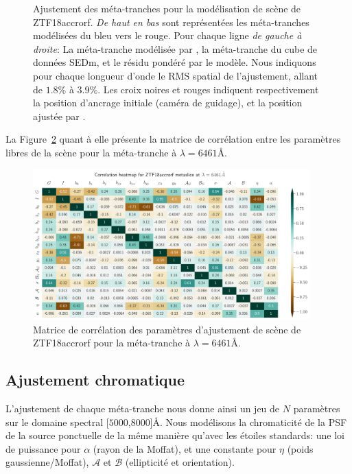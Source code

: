 \documentclass[../main/main.tex]{subfiles}
\begin{document}
\begin{figure}
  \caption[Ajustement des méta-tranches pour la modélisation de scène de ZTF18accrorf.
  ]{Ajustement des méta-tranches pour la modélisation de scène de
    ZTF18accrorf. \emph{De haut en bas} sont représentées les
    méta-tranches modélisées du bleu vers le rouge. Pour chaque ligne
    \emph{de gauche à droite}: La méta-tranche modélisée par \hypergal,
    la méta-tranche du cube de données SEDm, et le résidu pondéré par le
  modèle. Nous indiquons pour chaque longueur d'onde le RMS spatial de
  l'ajustement, allant de $1.8\%$ à $3.9\%$. Les croix noires et rouges
  indiquent respectivement la position d'ancrage initiale (caméra de
  guidage), et la position ajustée par \hypergal.}
  \label{fig:metaslicescene}
\end{figure}

La Figure~\ref{fig:corrmatrixmetaslice} quant à elle présente la matrice
de corrélation entre les paramètres libres de la scène pour la
méta-tranche à $\lambda=6461$\AA.
\begin{figure}
  \centering
  \includegraphics[width=0.95\textwidth]{../figures/07_scene/heatmapcorrelation_metaslice.pdf}
  \caption[Matrice de corrélation des paramètres d'ajustement de scène
  pour une méta-tranche.]{Matrice de corrélation des paramètres
    d'ajustement de scène de ZTF18accrorf pour la méta-tranche à $\lambda=6461$\AA.}
  \label{fig:corrmatrixmetaslice}
\end{figure}

\subsection{Ajustement chromatique}
L'ajustement de chaque méta-tranche nous donne ainsi un jeu de $N$
paramètres sur le domaine spectral [$5000$,$8000$]\AA. Nous modélisons
la chromaticité de la PSF de la source ponctuelle de la même manière
qu'avec les étoiles standards: une loi de puissance pour $\alpha$ (rayon
de la Moffat), et
une constante pour $\eta$ (poids gaussienne/Moffat), $\mathcal{A}$ et
$\mathcal{B}$ (ellipticité et orientation).
\end{document}
